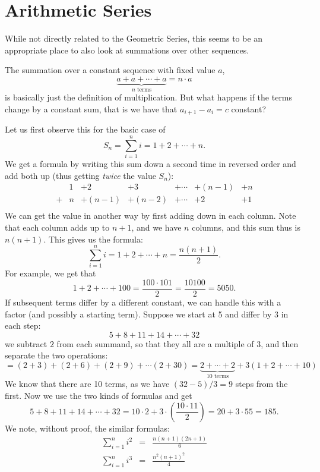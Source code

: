 \section{Arithmetic Series}

While not directly related to the Geometric Series, this seems to be an
appropriate place to also look at summations over other sequences.

The summation over a constant sequence with fixed value $a$,
\[
\underbrace{a+a+\cdots +a}_{\mbox{$n$ terms}}=n\cdot a
\]
is basically just the definition of multiplication. But what happens if the
terms change by a constant sum, that is we have that $a_{i+1}-a_i=c$
constant?

Let us first observe this for the basic case of
\[
S_n=\sum_{i=1}^n i=1+2+\cdots+n.
\]
We get a formula by writing this sum down a second time in reversed order
and add both up (thus getting {\em twice} the value $S_n$):
\[
\begin{array}{ccccccc}
&1&+2&+3&+\cdots&+(n-1)&+n\\
+&n&+(n-1)&+(n-2)&+\cdots&+2&+1\\
\end{array}
\]
We can get the value in another way by first adding down in each column.
Note that each column adds up to $n+1$, and we have $n$ columns, and this
sum thus is $n(n+1)$. This gives us the formula:
\[
\sum_{i=1}^n i=1+2+\cdots+n=\frac{n(n+1)}{2}.
\]
For example, we get that
\[
1+2+\cdots+100=\frac{100\cdot 101}{2}=\frac{10100}{2}=5050.
\]
If subsequent terms differ by a different constant, we can handle this with
a factor (and possibly a starting term). Suppose we start at 5 and differ by
3 in each step:
\[
5+8+11+14+\cdots+32
\]
we subtract $2$ from each summand, so that they all are a multiple of $3$,
and then separate the two operations:
\[
=(2+3)+(2+6)+(2+9)+\cdots(2+30)=\underbrace{2+\cdots+2}_{\mbox{$10$ terms}}
+3\left(1+2+\cdots+10\right)
\]
We know that there are 10 terms, as we have $(32-5)/3=9$ steps from the
first. Now we use the two kinds of formulas and get
\[
5+8+11+14+\cdots+32=10\cdot 2+ 3\cdot\left(\frac{10\cdot
11}{2}\right)=20+3\cdot 55=185.
\]
We note, without proof, the similar formulas:
\begin{eqnarray*}
\sum_{i=1}^n i^2&=&\frac{n(n+1)(2n+1)}{6}\\
\sum_{i=1}^n i^3&=&\frac{n^2(n+1)^2}{4}\\
\end{eqnarray*}

